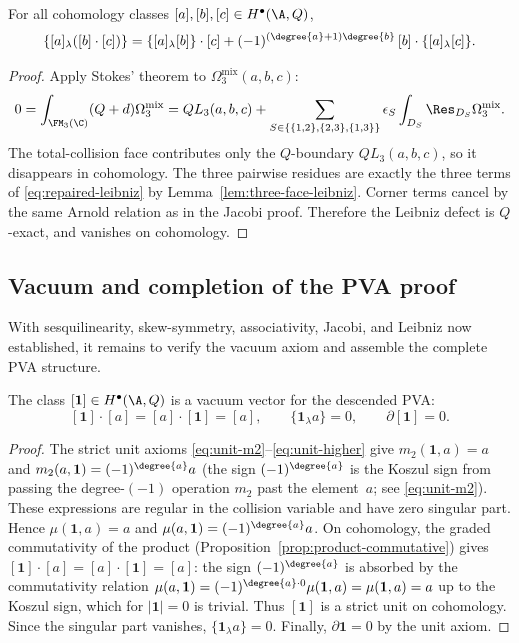 \begin{proposition}
\label{prop:PVA3_proof}
\label{prop:Leibniz}
For all cohomology classes $[a],[b],[c]\in H^\bullet(\A,Q)$,
\begin{equation}
\label{eq:repaired-leibniz}
\{[a]_\lambda([b]\cdot[c])\}
=
\{[a]_\lambda[b]\}\cdot[c]
+
(-1)^{(\degree{a}+1)\degree{b}}\,[b]\cdot\{[a]_\lambda[c]\}.
\end{equation}
\end{proposition}

\begin{proof}
Apply Stokes' theorem to $\Omega_3^{\mathrm{mix}}(a,b,c)$:
\[
0
=
\int_{\FM_3(\C)}(Q+d)\Omega_3^{\mathrm{mix}}
=
QL_3(a,b,c)
+
\sum_{S\in\{\{1,2\},\{2,3\},\{1,3\}\}}
\epsilon_S\int_{D_S}\Res_{D_S}\Omega_3^{\mathrm{mix}}.
\]
The total-collision face contributes only the $Q$-boundary $QL_3(a,b,c)$, so it
disappears in cohomology. The three pairwise residues are exactly the three terms of
\eqref{eq:repaired-leibniz} by Lemma~\ref{lem:three-face-leibniz}. Corner terms cancel by
the same Arnold relation as in the Jacobi proof. Therefore the Leibniz defect is
$Q$-exact, and vanishes on cohomology.
\end{proof}

\subsection{Vacuum and completion of the PVA proof}

With sesquilinearity, skew-symmetry, associativity, Jacobi, and
Leibniz now established, it remains to verify the vacuum axiom
and assemble the complete PVA structure.

\begin{proposition}
\label{prop:PVA4_proof}
The class $[\mathbf 1]\in H^\bullet(\A,Q)$ is a vacuum vector for the descended PVA:
\[
[\mathbf 1]\cdot[a]=[a]\cdot[\mathbf 1]=[a],
\qquad
\{\mathbf 1_\lambda a\}=0,
\qquad
\partial[\mathbf 1]=0.
\]
\end{proposition}

\begin{proof}
The strict unit axioms \eqref{eq:unit-m2}--\eqref{eq:unit-higher} give
$m_2(\mathbf 1,a)=a$ and $m_2(a,\mathbf 1)=(-1)^{\degree{a}}a$
(the sign $(-1)^{\degree{a}}$ is the Koszul sign from passing the
degree-$(-1)$ operation $m_2$ past the element~$a$; see \eqref{eq:unit-m2}).
These expressions are regular in the collision variable and have zero singular
part. Hence $\mu(\mathbf 1,a)=a$ and $\mu(a,\mathbf 1)=(-1)^{\degree{a}}a$.
On cohomology, the graded commutativity of the product
(Proposition~\ref{prop:product-commutative}) gives
$[\mathbf 1]\cdot[a] = [a]\cdot[\mathbf 1] = [a]$: the sign
$(-1)^{\degree{a}}$ is absorbed by the commutativity relation
$\mu(a,\mathbf 1) = (-1)^{\degree{a}\cdot 0}\mu(\mathbf 1,a)
= \mu(\mathbf 1,a) = a$ up to the Koszul sign, which for
$|\mathbf 1|=0$ is trivial. Thus $[\mathbf 1]$ is a strict unit on cohomology.
Since the singular part vanishes,
$\{\mathbf 1_\lambda a\}=0$. Finally, $\partial\mathbf 1=0$ by the unit axiom.
\end{proof}

